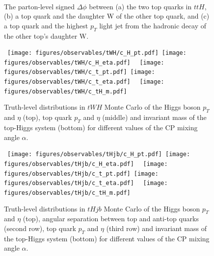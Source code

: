 \begin{figure}[htbp]
  \centering
  	\\
  \caption{The parton-level signed $\Delta\phi$ between (a) the two top quarks in $ttH$, (b) a top quark and the daughter W of the other top quark, and (c) a top quark and the highest $p_{T}$ light jet from the hadronic decay of the other top's daughter W.}
  \label{fig:ttH_truth2}
\end{figure}
\clearpage


\begin{figure}[!ht] 
  \begin{center}
    \mbox{ 
      \texttt{[image: figures/observables/tWH/c\_H\_pt.pdf]}
      \texttt{[image: figures/observables/tWH/c\_H\_eta.pdf]}
    }
    \mbox{ 
      \texttt{[image: figures/observables/tWH/c\_t\_pt.pdf]}
      \texttt{[image: figures/observables/tWH/c\_t\_eta.pdf]}
    }
    \mbox{ 
      \texttt{[image: figures/observables/tWH/c\_tH\_m.pdf]}
    }
  \end{center}
  \caption{Truth-level distributions in $tWH$ Monte Carlo of the Higgs boson $p_{T}$ and $\eta$ (top), top quark $p_{T}$ and $\eta$ (middle) and invariant mass of the top-Higgs system (bottom) for different values of the CP mixing angle $\alpha$.}
  \label{fig:tWH_truth}
\end{figure}
\clearpage


\begin{figure}[!ht] 
  \begin{center}
    \mbox{ 
      \texttt{[image: figures/observables/tHjb/c\_H\_pt.pdf]}
      \texttt{[image: figures/observables/tHjb/c\_H\_eta.pdf]}
    }
    \mbox{ 
      \texttt{[image: figures/observables/tHjb/c\_t\_pt.pdf]}
      \texttt{[image: figures/observables/tHjb/c\_t\_eta.pdf]}
    }
    \mbox{ 
      \texttt{[image: figures/observables/tHjb/c\_tH\_m.pdf]}
    }
  \end{center}
  \caption{Truth-level distributions in $tHjb$ Monte Carlo of the Higgs boson $p_{T}$ and $\eta$ (top), angular separation between top and anti-top quarks (second row), top quark $p_{T}$ and $\eta$ (third row) and invariant mass of the top-Higgs system (bottom) for different values of the CP mixing angle $\alpha$.}
  \label{fig:tHjb_truth}
\end{figure}
\clearpage

